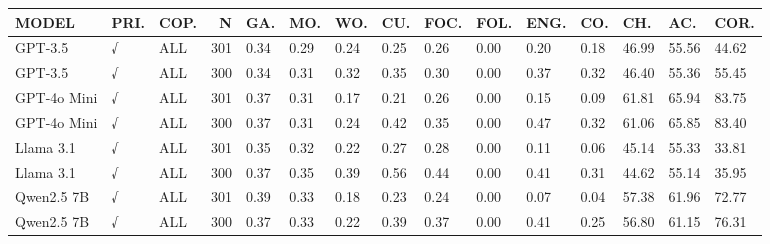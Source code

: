 \begin{tabular}{lllrlllllllllll}
\toprule
MODEL & PRI. & COP. & N & GA. & MO. & WO. & CU. & FOC. & FOL. & ENG. & CO. & CH. & AC. & COR. \\
\midrule
GPT-3.5 & √ & ALL & 301 & 0.34 & 0.29 & 0.24 & 0.25 & 0.26 & 0.00 & 0.20 & 0.18 & 46.99 & 55.56 & 44.62 \\
GPT-3.5 & √ & ALL & 300 & 0.34 & 0.31 & 0.32 & 0.35 & 0.30 & 0.00 & 0.37 & 0.32 & 46.40 & 55.36 & 55.45 \\
GPT-4o Mini & √ & ALL & 301 & 0.37 & 0.31 & 0.17 & 0.21 & 0.26 & 0.00 & 0.15 & 0.09 & 61.81 & 65.94 & 83.75 \\
GPT-4o Mini & √ & ALL & 300 & 0.37 & 0.31 & 0.24 & 0.42 & 0.35 & 0.00 & 0.47 & 0.32 & 61.06 & 65.85 & 83.40 \\
Llama 3.1 & √ & ALL & 301 & 0.35 & 0.32 & 0.22 & 0.27 & 0.28 & 0.00 & 0.11 & 0.06 & 45.14 & 55.33 & 33.81 \\
Llama 3.1 & √ & ALL & 300 & 0.37 & 0.35 & 0.39 & 0.56 & 0.44 & 0.00 & 0.41 & 0.31 & 44.62 & 55.14 & 35.95 \\
Qwen2.5 7B & √ & ALL & 301 & 0.39 & 0.33 & 0.18 & 0.23 & 0.24 & 0.00 & 0.07 & 0.04 & 57.38 & 61.96 & 72.77 \\
Qwen2.5 7B & √ & ALL & 300 & 0.37 & 0.33 & 0.22 & 0.39 & 0.37 & 0.00 & 0.41 & 0.25 & 56.80 & 61.15 & 76.31 \\
\bottomrule
\end{tabular}
